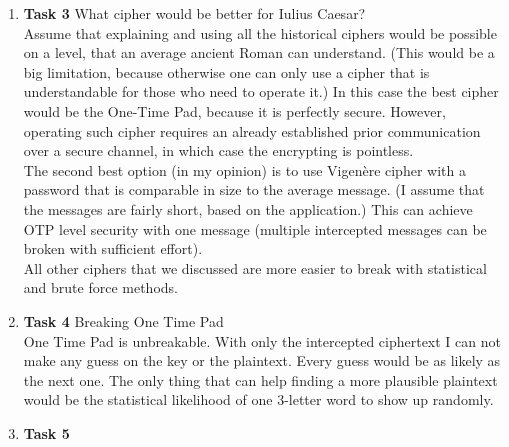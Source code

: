 \documentclass{article}
\begin{document}
\begin{enumerate}[label={}]
	\item \textbf{Task 3} What cipher would be better for Iulius Caesar?\\
		Assume that explaining and using all the historical ciphers would be possible on a level, that an average ancient Roman can understand. (This would be a big limitation, because otherwise one can only use a cipher that is understandable for those who need to operate it.) In this case the best cipher would be the One-Time Pad, because it is perfectly secure. However, operating such cipher requires an already established prior communication over a secure channel, in which case the encrypting is pointless.\\
		The second best option (in my opinion) is to use Vigenère cipher with a password that is comparable in size to the average message. (I assume that the messages are fairly short, based on the application.) This can achieve OTP level security with one message (multiple intercepted messages can be broken with sufficient effort).\\
		All other ciphers that we discussed are more easier to break with statistical and brute force methods.
	\item \textbf{Task 4} Breaking One Time Pad\\
		One Time Pad is unbreakable. With only the intercepted ciphertext I can not make any guess on the key or the plaintext. Every guess would be as likely as the next one. The only thing that can help finding a more plausible plaintext would be the statistical likelihood of one 3-letter word to show up randomly.
	\item \textbf{Task 5}
		
\end{enumerate}
\end{document}
